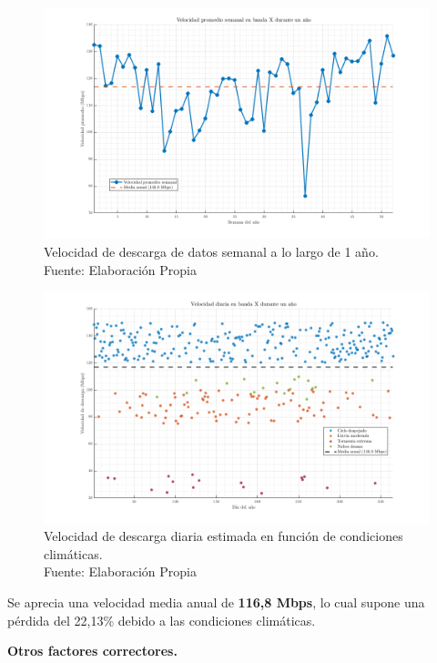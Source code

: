 \begin{figure}[H]
    \centering
    \includegraphics[width=1\linewidth]{7.Segmento_Tierra/velmediasemanal.png}
    \caption{Velocidad de descarga de datos semanal a lo largo de 1 año. \\Fuente: Elaboración Propia}
\end{figure}

\begin{figure}[H]
    \centering
    \includegraphics[width=1\linewidth]{7.Segmento_Tierra/veldiariabandax.png}
    \caption{Velocidad de descarga diaria estimada en función de condiciones climáticas.\\ Fuente: Elaboración Propia}
\end{figure}

Se aprecia una velocidad media anual de \textbf{116,8 Mbps}, lo cual supone una pérdida del 22,13\% debido a las condiciones climáticas.


\textbf{Otros factores correctores.}

